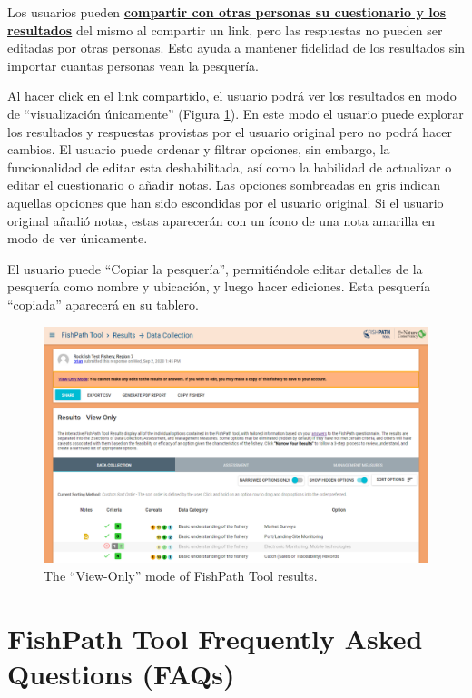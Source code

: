 \documentclass[
  11pt,
]{book}
\begin{document}
Los usuarios pueden \protect\hyperlink{Results-Actions}{\textbf{compartir con otras personas su cuestionario y los resultados}} del mismo al compartir un link, pero las respuestas no pueden ser editadas por otras personas. Esto ayuda a mantener fidelidad de los resultados sin importar cuantas personas vean la pesquería.

Al hacer click en el link compartido, el usuario podrá ver los resultados en modo de ``visualización únicamente'' (Figura \ref{fig:view-only}). En este modo el usuario puede explorar los resultados y respuestas provistas por el usuario original pero no podrá hacer cambios. El usuario puede ordenar y filtrar opciones, sin embargo, la funcionalidad de editar esta deshabilitada, así como la habilidad de actualizar o editar el cuestionario o añadir notas. Las opciones sombreadas en gris indican aquellas opciones que han sido escondidas por el usuario original. Si el usuario original añadió notas, estas aparecerán con un ícono de una nota amarilla en modo de ver únicamente.

El usuario puede ``Copiar la pesquería'', permitiéndole editar detalles de la pesquería como nombre y ubicación, y luego hacer ediciones. Esta pesquería ``copiada'' aparecerá en su tablero.

\begin{figure}

{\centering \includegraphics[width=0.95\linewidth]{images/view-only} 

}

\caption{The “View-Only” mode of FishPath Tool results.}\label{fig:view-only}
\end{figure}

\hypertarget{appendix-appendix}{%
\appendix}


\hypertarget{fishpath-tool-frequently-asked-questions-faqs}{%
\chapter{FishPath Tool Frequently Asked Questions (FAQs)}\label{fishpath-tool-frequently-asked-questions-faqs}}
\end{document}

